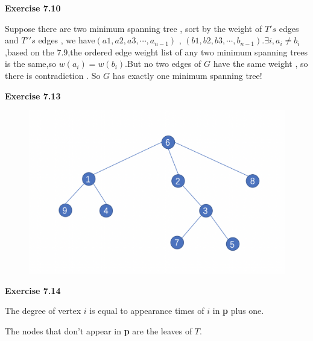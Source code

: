 \documentclass{article} %
\begin{document}
	
	\textbf{Exercise 7.10}\par
	Suppose there are two minimum spanning tree , sort by the weight of $T's$ edges and $T\prime's$ edges , we have$(a1,a2,a3,\cdots,a_{n-1})$ , $(b1,b2,b3,\cdots,b_{n-1})$.$\exists i,a_i \ne b_i$,based on the $7.9$,the ordered edge weight list of any two minimum spanning trees is the same,so $w(a_i)=w(b_i)$.But no two edges of $G$ have the same weight , so there is contradiction . So $G$ has exactly one minimum spanning tree!
    
    	\textbf{Exercise 7.13}\par
  	\begin{figure}[H]
  	\centering
  	\includegraphics[scale=0.6]{7.13.png}
  	\caption{}
  	\label{}
  	\end{figure}
	 
	\textbf{Exercise 7.14}\par
	The degree of vertex $i$ is equal to appearance times of $i$ in \textbf{p} plus one.\par
	The nodes that don't appear in \textbf{p} are the leaves of $T$.\par
	  
\end{document}
